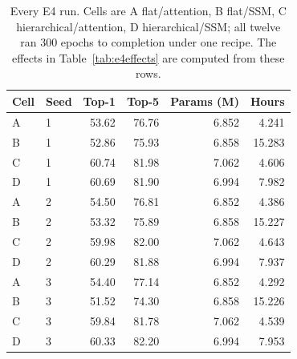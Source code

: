 \begin{table}[tbp]
\centering
\caption{Every E4 run. Cells are A flat/attention, B flat/SSM, C hierarchical/attention, D hierarchical/SSM; all twelve ran $300$ epochs to completion under one recipe. The effects in Table~\ref{tab:e4effects} are computed from these rows.}
\label{tab:e4runs}
\begin{tabular}{llrrrr}
\toprule
Cell & Seed & Top-1 & Top-5 & Params (M) & Hours \\
\midrule
A & 1 & 53.62 & 76.76 & 6.852 & 4.241 \\
B & 1 & 52.86 & 75.93 & 6.858 & 15.283 \\
C & 1 & 60.74 & 81.98 & 7.062 & 4.606 \\
D & 1 & 60.69 & 81.90 & 6.994 & 7.982 \\
A & 2 & 54.50 & 76.81 & 6.852 & 4.386 \\
B & 2 & 53.32 & 75.89 & 6.858 & 15.227 \\
C & 2 & 59.98 & 82.00 & 7.062 & 4.643 \\
D & 2 & 60.29 & 81.88 & 6.994 & 7.937 \\
A & 3 & 54.40 & 77.14 & 6.852 & 4.292 \\
B & 3 & 51.52 & 74.30 & 6.858 & 15.226 \\
C & 3 & 59.84 & 81.78 & 7.062 & 4.539 \\
D & 3 & 60.33 & 82.20 & 6.994 & 7.953 \\
\bottomrule
\end{tabular}
\end{table}
